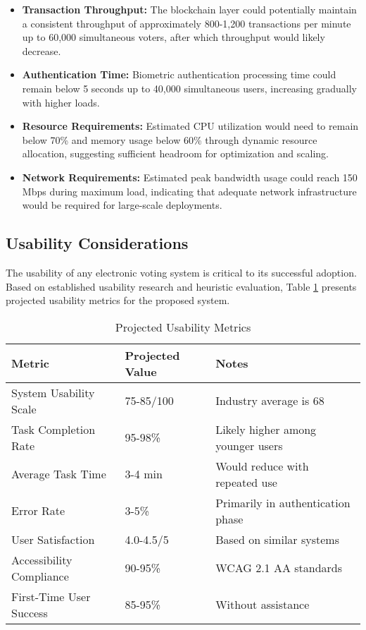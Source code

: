 \documentclass[conference]{IEEEtran}
\begin{document}
\begin{itemize}
    \item \textbf{Transaction Throughput:} The blockchain layer could potentially maintain a consistent throughput of approximately 800-1,200 transactions per minute up to 60,000 simultaneous voters, after which throughput would likely decrease.
    
    \item \textbf{Authentication Time:} Biometric authentication processing time could remain below 5 seconds up to 40,000 simultaneous users, increasing gradually with higher loads.
    
    \item \textbf{Resource Requirements:} Estimated CPU utilization would need to remain below 70\% and memory usage below 60\% through dynamic resource allocation, suggesting sufficient headroom for optimization and scaling.
    
    \item \textbf{Network Requirements:} Estimated peak bandwidth usage could reach 150 Mbps during maximum load, indicating that adequate network infrastructure would be required for large-scale deployments.
\end{itemize}

\subsection{Usability Considerations}
The usability of any electronic voting system is critical to its successful adoption. Based on established usability research and heuristic evaluation, Table \ref{tab:usability} presents projected usability metrics for the proposed system.

\begin{table}[!h]
\caption{Projected Usability Metrics}
\label{tab:usability}
\centering
\begin{tabular}{|p{3cm}|p{1.5cm}|p{3.5cm}|}
\hline
\textbf{Metric} & \textbf{Projected Value} & \textbf{Notes} \\
\hline
System Usability Scale & 75-85/100 & Industry average is 68 \\
\hline
Task Completion Rate & 95-98\% & Likely higher among younger users \\
\hline
Average Task Time & 3-4 min & Would reduce with repeated use \\
\hline
Error Rate & 3-5\% & Primarily in authentication phase \\
\hline
User Satisfaction & 4.0-4.5/5 & Based on similar systems \\
\hline
Accessibility Compliance & 90-95\% & WCAG 2.1 AA standards \\
\hline
First-Time User Success & 85-95\% & Without assistance \\
\hline
\end{tabular}
\end{table}
\end{document}

